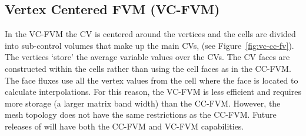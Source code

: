 \subsection{Vertex Centered FVM (VC-FVM)}

In the VC-FVM the CV is centered around the vertices and the cells are
divided into sub-control volumes that make up the main CVs, (see
Figure~\ref{fig:vc-cc-fv}).  The vertices `store' the average variable
values over the CVs.  The CV faces are constructed within the cells
rather than using the cell faces as in the CC-FVM. The face fluxes use
all the vertex values from the cell where the face is located to
calculate interpolations.  For this reason, the VC-FVM is less
efficient and requires more storage (a larger matrix band width) than
the CC-FVM. However, the mesh topology does not have the same
restrictions as the CC-FVM. Future releases of \FiPy{} will have both
the CC-FVM and VC-FVM capabilities.

